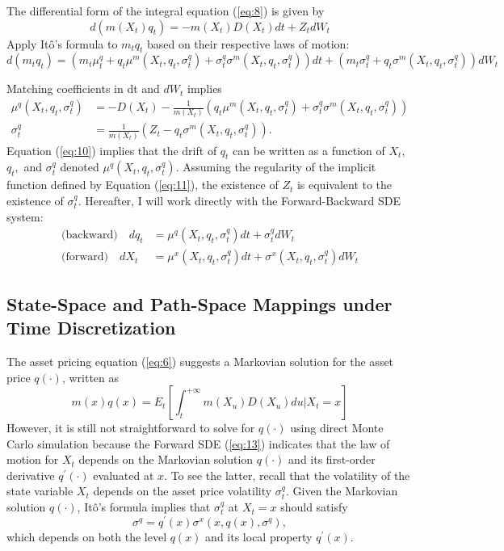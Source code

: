 \documentclass{article}
\begin{document}
The differential form of the integral equation (\ref{eq:8}) is given by
\[
d(m(X_{t})q_{t})=-m(X_{t})D(X_{t})dt+Z_{t}dW_{t}
\]
Apply Itô's formula to $m_{t}q_{t}$ based on their respective laws of motion:
\[
d(m_{t}q_{t})=(m_{t}\mu_{t}^{q}+q_{t}\mu^{m}(X_{t},q_{t},\sigma_{t}^{q})+\sigma_{t}^{q}\sigma^{m}(X_{t},q_{t},\sigma_{t}^{q}))dt+(m_{t}\sigma_{t}^{q}+q_{t}\sigma^{m}(X_{t},q_{t},\sigma_{t}^{q}))dW_{t}
\]

\clearpage

Matching coefficients in dt and $dW_{t}$ implies
\begin{align}
\mu^{q}(X_{t},q_{t},\sigma_{t}^{q})&=-D(X_{t})-\frac{1}{m(X_{t})}(q_{t}\mu^{m}(X_{t},q_{t},\sigma_{t}^{q})+\sigma_{t}^{q}\sigma^{m}(X_{t},q_{t},\sigma_{t}^{q})) \label{eq:10} \\
\sigma_{t}^{q}&=\frac{1}{m(X_{t})}(Z_{t}-q_{t}\sigma^{m}(X_{t},q_{t},\sigma_{t}^{q})). \label{eq:11}
\end{align}
Equation (\ref{eq:10}) implies that the drift of $q_{t}$ can be written as a function of $X_{t}$, $q_{t},$ and $\sigma_{t}^{q}$ denoted $\mu^{q}(X_{t},q_{t},\sigma_{t}^{q})$. Assuming the regularity of the implicit function defined by Equation (\ref{eq:11}), the existence of $Z_{t}$ is equivalent to the existence of $\sigma_{t}^{q}.$ Hereafter, I will work directly with the Forward-Backward SDE system:
\begin{align}
\text{(backward)} \quad dq_{t}&=\mu^{q}(X_{t},q_{t},\sigma_{t}^{q})dt+\sigma_{t}^{q}dW_{t} \label{eq:12} \\
\text{(forward)} \quad dX_{t}&=\mu^{x}(X_{t},q_{t},\sigma_{t}^{q})dt+\sigma^{x}(X_{t},q_{t},\sigma_{t}^{q})dW_{t} \label{eq:13}
\end{align}

\subsection{State-Space and Path-Space Mappings under Time Discretization}
The asset pricing equation (\ref{eq:6}) suggests a Markovian solution for the asset price $q(\cdot)$, written as
\[
m(x)q(x)=E_{t}\left[\int_{t}^{+\infty}m(X_{u})D(X_{u})du|X_{t}=x\right]
\]
However, it is still not straightforward to solve for $q(\cdot)$ using direct Monte Carlo simulation because the Forward SDE (\ref{eq:13}) indicates that the law of motion for $X_{t}$ depends on the Markovian solution $q(\cdot)$ and its first-order derivative $q^{\prime}(\cdot)$ evaluated at $x$. To see the latter, recall that the volatility of the state variable $X_{t}$ depends on the asset price volatility $\sigma_{t}^{q}$. Given the Markovian solution $q(\cdot)$, Itô's formula implies that $\sigma_{t}^{q}$ at $X_{t}=x$ should satisfy
\begin{equation}
\sigma^{q}=q^{\prime}(x)\sigma^{x}(x,q(x),\sigma^{q}),
\label{eq:14}
\end{equation}
which depends on both the level $q(x)$ and its local property $q^{\prime}(x)$.
\end{document}
